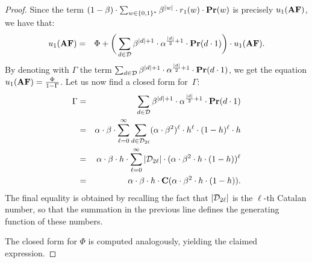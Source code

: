 \begin{proof}
%
Since the term $(1-\beta) \cdot \sum_{w\in \{0,1\}^*} \beta^{|w|} \cdot r_1(w) \cdot \mathbf{Pr}(w)$ is precisely $u_1(\text{\rm {\bf AF}})$, we have that:
%
\begin{eqnarray*}
 u_1(\text{\rm {\bf AF}}) & = & \Phi + 
 \bigg(\sum_{d\in \mathcal{D}} \beta^{|d|+1}\cdot \alpha^{\frac{|d|}{2}+1}\cdot \mathbf{Pr}(d\cdot 1)\bigg) \cdot u_1(\text{\rm {\bf AF}}).
\end{eqnarray*}
%
By denoting with $\Gamma$ the term $\sum_{d\in \mathcal{D}} \beta^{|d|+1}\cdot \alpha^{\frac{|d|}{2}+1}\cdot \mathbf{Pr}(d\cdot 1)$, we get the equation
$u_1(\text{\rm {\bf AF}}) = \frac{\Phi}{1-\Gamma}$.
Let us now find a closed form for~$\Gamma$:
%
\begin{eqnarray*}
\Gamma & = & \sum_{d\in \mathcal{D}} \beta^{|d|+1}\cdot \alpha^{\frac{|d|}{2}+1}\cdot \mathbf{Pr}(d\cdot 1)\\
& = & \alpha\cdot \beta \cdot \sum_{\ell = 0}^{\infty} \sum_{d\in \mathcal{D}_{2\ell}} (\alpha\cdot \beta^2)^{\ell}\cdot h^{\ell}\cdot (1-h)^{\ell}\cdot h\\
& = & \alpha\cdot \beta \cdot h \cdot \sum_{\ell = 0}^{\infty} |\mathcal{D}_{2\ell}| \cdot (\alpha\cdot \beta^2 \cdot h \cdot (1-h))^{\ell}\\
& = & \alpha\cdot \beta \cdot h \cdot \mathbf{C}(\alpha\cdot\beta^2 \cdot h \cdot (1-h)).
\end{eqnarray*}
%
The final equality is obtained by recalling the fact that $|\mathcal{D}_{2\ell}|$ is the $\ell$-th Catalan number, so that the summation in the previous line defines the generating function of these numbers. 

The closed form for $\Phi$ is computed analogously, yielding the claimed expression.
\end{proof}




